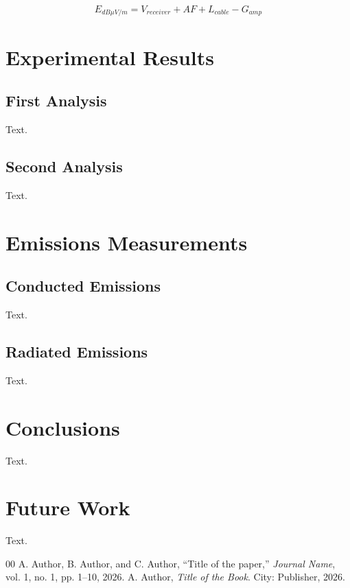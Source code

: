 \documentclass[conference]{IEEEtran}
\begin{document}
\begin{equation}
  E_{dB\mu V/m} = V_{receiver} + AF + L_{cable} - G_{amp}
  \label{eq:field}
\end{equation}

\section{Experimental Results}\label{sec:results}

\subsection{First Analysis}
Text.

\subsection{Second Analysis}
Text.

\section{Emissions Measurements}\label{sec:emissions}

\subsection{Conducted Emissions}
Text.

\subsection{Radiated Emissions}
Text.

\section{Conclusions}\label{sec:conclusions}

Text.

\section{Future Work}\label{sec:future}

Text.

\begin{thebibliography}{00}
 A. Author, B. Author, and C. Author, ``Title of the paper,'' \textit{Journal Name}, vol. 1, no. 1, pp. 1--10, 2026.
 A. Author, \textit{Title of the Book}. City: Publisher, 2026.
\end{thebibliography}
\end{document}
